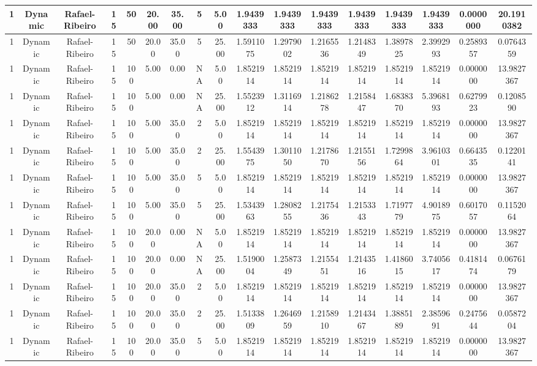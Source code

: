 \begin{longtable}{ | c | c | c | c | c | c | c | c | c | c | c | c | c | c | c | c | c | }
	\hline
	1	&	Dynamic	&	Rafael-Ribeiro	&	15	&	50	&	20.00	&	35.00	&	5	&	5.00	&	1.9439333	&	1.9439333	&	1.9439333	&	1.9439333	&	1.9439333	&	1.9439333	&	0.0000000	&	20.1910382 \\
	\hline
	1	&	Dynamic	&	Rafael-Ribeiro	&	15	&	50	&	20.00	&	35.00	&	5	&	25.00	&	1.5911075	&	1.2979002	&	1.2165536	&	1.2148349	&	1.3897825	&	2.3992993	&	0.2589357	&	0.0764359 \\
	\hline
	1	&	Dynamic	&	Rafael-Ribeiro	&	15	&	100	&	5.00	&	0.00	&	NA	&	5.00	&	1.8521914	&	1.8521914	&	1.8521914	&	1.8521914	&	1.8521914	&	1.8521914	&	0.0000000	&	13.9827367 \\
	\hline
	1	&	Dynamic	&	Rafael-Ribeiro	&	15	&	100	&	5.00	&	0.00	&	NA	&	25.00	&	1.5523912	&	1.3116914	&	1.2186278	&	1.2158447	&	1.6838370	&	5.3968193	&	0.6279923	&	0.1208590 \\
	\hline
	1	&	Dynamic	&	Rafael-Ribeiro	&	15	&	100	&	5.00	&	35.00	&	2	&	5.00	&	1.8521914	&	1.8521914	&	1.8521914	&	1.8521914	&	1.8521914	&	1.8521914	&	0.0000000	&	13.9827367 \\
	\hline
	1	&	Dynamic	&	Rafael-Ribeiro	&	15	&	100	&	5.00	&	35.00	&	2	&	25.00	&	1.5543975	&	1.3011050	&	1.2178670	&	1.2155156	&	1.7299864	&	3.9610301	&	0.6643535	&	0.1220141 \\
	\hline
	1	&	Dynamic	&	Rafael-Ribeiro	&	15	&	100	&	5.00	&	35.00	&	5	&	5.00	&	1.8521914	&	1.8521914	&	1.8521914	&	1.8521914	&	1.8521914	&	1.8521914	&	0.0000000	&	13.9827367 \\
	\hline
	1	&	Dynamic	&	Rafael-Ribeiro	&	15	&	100	&	5.00	&	35.00	&	5	&	25.00	&	1.5343963	&	1.2808255	&	1.2175436	&	1.2153343	&	1.7197779	&	4.9018975	&	0.6017057	&	0.1152064 \\
	\hline
	1	&	Dynamic	&	Rafael-Ribeiro	&	15	&	100	&	20.00	&	0.00	&	NA	&	5.00	&	1.8521914	&	1.8521914	&	1.8521914	&	1.8521914	&	1.8521914	&	1.8521914	&	0.0000000	&	13.9827367 \\
	\hline
	1	&	Dynamic	&	Rafael-Ribeiro	&	15	&	100	&	20.00	&	0.00	&	NA	&	25.00	&	1.5190004	&	1.2587349	&	1.2155451	&	1.2143516	&	1.4186015	&	3.7405617	&	0.4181474	&	0.0676179 \\
	\hline
	1	&	Dynamic	&	Rafael-Ribeiro	&	15	&	100	&	20.00	&	35.00	&	2	&	5.00	&	1.8521914	&	1.8521914	&	1.8521914	&	1.8521914	&	1.8521914	&	1.8521914	&	0.0000000	&	13.9827367 \\
	\hline
	1	&	Dynamic	&	Rafael-Ribeiro	&	15	&	100	&	20.00	&	35.00	&	2	&	25.00	&	1.5133809	&	1.2646959	&	1.2158910	&	1.2143467	&	1.3885189	&	2.3859691	&	0.2475644	&	0.0587204 \\
	\hline
	1	&	Dynamic	&	Rafael-Ribeiro	&	15	&	100	&	20.00	&	35.00	&	5	&	5.00	&	1.8521914	&	1.8521914	&	1.8521914	&	1.8521914	&	1.8521914	&	1.8521914	&	0.0000000	&	13.9827367 \\

\end{longtable}
